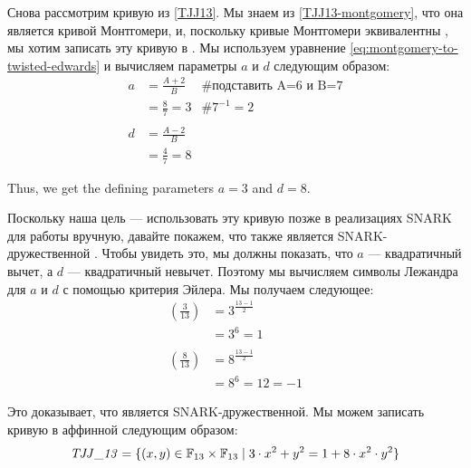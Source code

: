 \begin{example}\label{ex:TJJ13-twisted-edwards}Снова рассмотрим кривую  из \examplename{} \ref{TJJ13}. Мы знаем из \examplename{} \ref{TJJ13-montgomery}, что она является кривой Монтгомери, и, поскольку кривые Монтгомери эквивалентны , мы хотим записать эту кривую в . Мы используем уравнение \eqref{eq:montgomery-to-twisted-edwards} и вычисляем параметры $a$ и $d$ следующим образом:
\begin{align*}
a & = \frac{A+2}{B} & \text{\# подставить A=6 и B=7}\\
  & = \frac{8}{7} = 3 & \text{\# } 7^{-1}= 2 \\
  \\
d & = \frac{A-2}{B} \\
  & = \frac{4}{7} = 8 
\end{align*}

Thus, we get the defining parameters  $a= 3$ and $d=8$. 

Поскольку наша цель — использовать эту кривую позже в реализациях SNARK для работы вручную, давайте покажем, что  также является SNARK-дружественной . Чтобы увидеть это, мы должны показать, что $a$ — квадратичный вычет, а $d$ — квадратичный невычет. Поэтому мы вычисляем символы Лежандра для $a$ и $d$ с помощью критерия Эйлера. Мы получаем следующее:
\begin{align*}
\left(\frac{3}{13}\right) &= 3^{\frac{13-1}{2}} \\
                          & = 3^6 
                            = 1\\
                          \\
\left(\frac{8}{13}\right) &= 8^{\frac{13-1}{2}} \\
                          & = 8^6 
                            = 12
                            = -1                     
\end{align*}

Это доказывает, что  является SNARK-дружественной. Мы можем записать кривую  в аффинной  следующим образом:
\begin{equation}\label{eq:TJJ13-twisted-edwards}
\mathit{TJJ\_13} = \{(x,y)\in \mathbb{F}_{13}\times \mathbb{F}_{13}\;|\; 3\cdot x^{2} + y^2 =1+ 8\cdot x^{2}\cdot y^2 \}
\end{equation}


\end{example}
